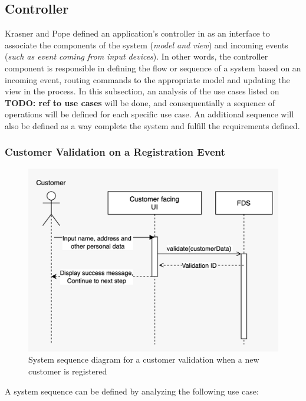 \subsection{Controller}
 \label{subsection:controller}

Krasner and Pope defined an application's controller in \autocite{krasner-pope-88} as an interface to associate the components of the system (\emph{model and view}) and incoming events (\emph{such as event coming from input devices}). In other words, the controller component is responsible in defining the flow or sequence of a system based on an incoming event, routing commands to the appropriate model and updating the view in the process.
In this subsection, an analysis of the use cases listed on \textbf{TODO: ref to use cases} will be done, and consequentially a sequence of operations will be defined for each specific use case. An additional sequence will also be defined as a way complete the system and fulfill the requirements defined. 


\subsubsection{Customer Validation on a Registration Event}
 \label{subsection:regis}

\begin{figure}[!ht]
 \includegraphics[width=\textwidth]{diagrams/sequence_registration.jpeg}
 \caption{System sequence diagram for a customer validation when a new customer is registered}
 \label{fig:regis-sequence}
\end{figure}

A system sequence can be defined by analyzing the following use case:

